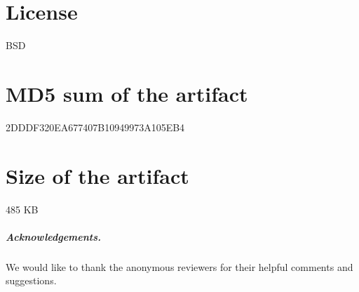 \documentclass[a4paper,UKenglish]{darts-v2018}
\newcommand{\license}[1]{{\section{License}#1}}
\newcommand{\mdsum}[1]{{\section{MD5 sum of the artifact}#1}}
\newcommand{\artifactsize}[1]{{\section{Size of the artifact}#1}}
\begin{document}
\license{BSD}

\mdsum{2DDDF320EA677407B10949973A105EB4}

\artifactsize{485 KB}

\subparagraph*{Acknowledgements.}

We would like to thank the anonymous reviewers for their helpful comments
and suggestions.







% 

\end{document}
